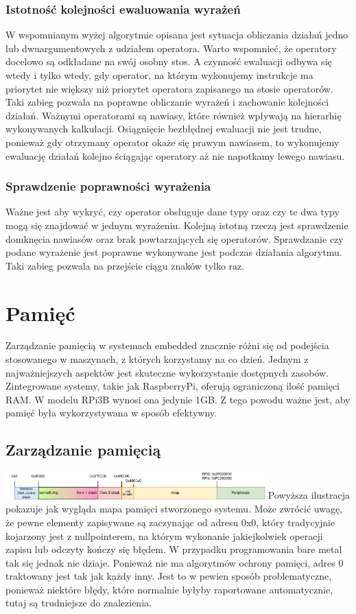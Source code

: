 \documentclass[shortabstract]{iithesis}
\begin{document}
\subsection{Istotność kolejności ewaluowania wyrażeń}
W wspomnianym wyżej algorytmie opisana jest sytuacja obliczania działań jedno lub dwuargumentowych z udziałem operatora. Warto wspomnieć, że operatory docelowo są odkładane na swój osobny stos. A czynność ewaluacji odbywa się wtedy i tylko wtedy, gdy operator, na którym wykonujemy instrukcje ma priorytet nie większy niż priorytet operatora zapisanego na stosie operatorów. Taki zabieg pozwala na poprawne obliczanie wyrażeń i zachowanie kolejności działań. Ważnymi operatorami są nawiasy, które również wpływają na hierarhię wykonywanych kalkulacji. Osiągnięcie bezbłędnej ewaluacji nie jest trudne, ponieważ gdy otrzymany operator okaże się prawym nawiasem, to wykonujemy ewaluację działań kolejno ściągając operatory aż nie napotkamy lewego nawiasu.
\subsection{Sprawdzenie poprawności wyrażenia}
Ważne jest aby wykryć, czy operator obsługuje dane typy oraz czy te dwa typy mogą się znajdować w jednym wyrażeniu. Kolejną istotną rzeczą jest sprawdzenie domknęcia nawiasów oraz brak powtarzających się operatorów. Sprawdzanie czy podane wyrażenie jest poprawne wykonywane jest podczas działania algorytmu. Taki zabieg pozwala na przejście ciągu znaków tylko raz.


\chapter{Pamięć}
Zarządzanie pamięcią w systemach embedded znacznie różni się od podejścia stosowanego w maszynach, z których korzystamy na co dzień. Jednym z najważniejszych aspektów jest skuteczne wykorzystanie dostępnych zasobów. Zintegrowane systemy, takie jak RaspberryPi, oferują ograniczoną ilość pamięci RAM. W modelu RPi3B wynosi ona jedynie 1GB. Z tego powodu ważne jest, aby pamięć była wykorzystywana w sposób efektywny.

\section{Zarządzanie pamięcią}
\begingroup
\centering
\includegraphics[width=0.75\textwidth]{memorymap.png}
\endgroup
Powyższa ilustracja pokazuje jak wygląda mapa pamięci stworzonego systemu. Może zwrócić uwagę, że pewne elementy zapisywane są zaczynając od adresu 0x0, który tradycyjnie kojarzony jest z nullpointerem, na którym wykonanie jakiejkolwiek operacji zapisu lub odczyty kończy się błędem. W przypadku programowania bare metal tak się jednak nie dziaje. Ponieważ nie ma algorytmów ochrony pamięci, adres 0 traktowany jest tak jak każdy inny. Jest to w pewien sposób problematyczne, ponieważ niektóre błędy, które normalnie byłyby raportowane automatycznie, tutaj są trudniejsze do znalezienia.
\end{document}

